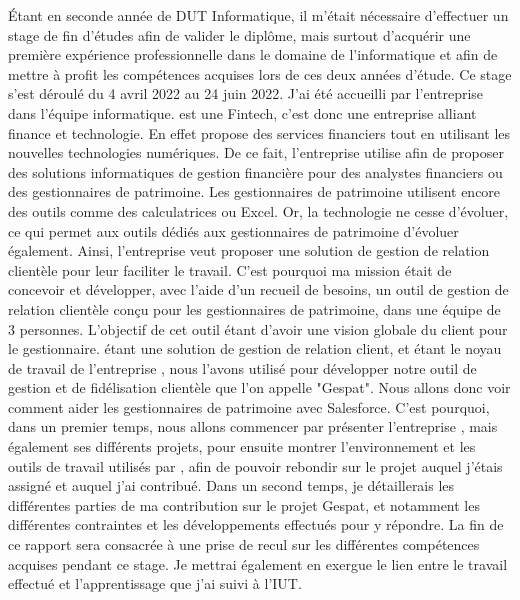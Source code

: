 \documentclass[12pt, a4paper]{article}
\title{\vspace{-5cm}}
\date{}
\begin{document}
\maketitle

Étant en seconde année de DUT Informatique, il m'était nécessaire d'effectuer un stage de fin d'études afin de valider le diplôme, mais surtout d'acquérir une première expérience professionnelle dans le domaine de l'informatique et afin de mettre à profit les compétences acquises lors de ces deux années d'étude. Ce stage s'est déroulé du 4 avril 2022 au 24 juin 2022. J'ai été accueilli par l'entreprise \glaz{} dans l'équipe informatique. \newline
\glaz{} est une Fintech, c'est donc une entreprise alliant finance et technologie. En effet \gz{} propose des services financiers tout en utilisant les nouvelles technologies numériques. De ce fait, l'entreprise utilise \slf{} afin de proposer des solutions informatiques de gestion financière pour des analystes financiers ou des gestionnaires de patrimoine.
Les gestionnaires de patrimoine utilisent encore des outils comme des calculatrices ou Excel. Or, la technologie ne cesse d’évoluer, ce qui permet aux outils dédiés aux gestionnaires de patrimoine d'évoluer également.
Ainsi, l'entreprise \glaz{} veut proposer une solution de gestion de relation clientèle pour leur faciliter le travail. C'est pourquoi ma mission était de concevoir et développer, avec l'aide d'un recueil de besoins, un outil de gestion de relation clientèle conçu pour les gestionnaires de patrimoine, dans une équipe de 3 personnes. L'objectif de cet outil étant d'avoir une vision globale du client pour le gestionnaire.
\slf{} étant une solution de gestion de relation client, et étant le noyau de travail de l'entreprise \glaz{}, nous l'avons utilisé pour développer notre outil de gestion et de fidélisation clientèle que l'on appelle "Gespat". Nous allons donc voir comment aider les gestionnaires de patrimoine avec Salesforce.\newline
C'est pourquoi, dans un premier temps, nous allons commencer par présenter l'entreprise \glaz{}, mais également ses différents projets, pour ensuite montrer l'environnement et les outils de travail utilisés par \gz{}, afin de pouvoir rebondir sur le projet auquel j'étais assigné et auquel j'ai contribué.
Dans un second temps, je détaillerais les différentes parties de ma contribution sur le projet Gespat, et notamment les différentes contraintes et les développements effectués pour y répondre.
La fin de ce rapport sera consacrée à une prise de recul sur les différentes compétences acquises pendant ce stage. Je mettrai également en exergue le lien entre le travail effectué et l'apprentissage que j'ai suivi à l'IUT.
\end{document}
